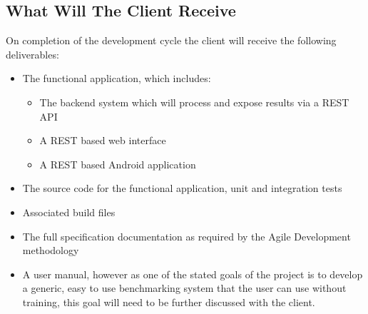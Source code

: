 \subsection{What Will The Client Receive}
On completion of the development cycle the client will receive the following deliverables:
\begin{itemize}
	\item The functional application, which includes:
	\begin{itemize}
		\item The backend system which will process and expose results via a REST API
		\item A REST based web interface
		\item A REST based Android application
	\end{itemize}
	\item The source code for the functional application, unit and integration tests
	\item Associated build files
	\item The full specification documentation as required by the Agile Development methodology
	\item A user manual, however as one of the stated goals of the project is to develop a generic, easy to use benchmarking system that the user can use without training, this goal will need to be further discussed with the client.
\end{itemize}
